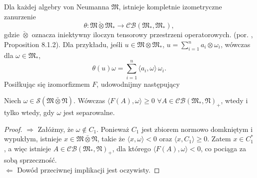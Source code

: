 Dla każdej algebry von Neumanna $\mathfrak{M}$,
istnieje kompletnie izometryczne zanurzenie
\begin{equation}
\theta: \mathfrak{M} \check{\otimes} \mathfrak{M}_{*}\rightarrow
\mathcal{CB}(\mathfrak{M}_{*}, \mathfrak{M}_{*}),
\end{equation}
gdzie $\check{\otimes}$ oznacza iniektywny iloczyn tensorowy przestrzeni operatorowych.
(por. \cite{Effros2000}, Proposition 8.1.2).
Dla przykładu, jeśli
$u \in \mathfrak{M} \otimes \mathfrak{M}_{*}$, $u = \sum_{i = 1}^{n} a_{i} \otimes \omega_{i}$,
wówczas dla $\omega \in \mathfrak{M}_{*}$,
\begin{equation}
\theta(u)\omega = \sum_{i=1}^{n} \langle a_{i} , \omega \rangle \, \omega_{i}.
\end{equation}
Posiłkując się izomorfizmem $F$,
udowodnijmy następujący
\begin{Lemma}
\label{prop:34523}
Niech $\omega\in \mathcal{S}(\mathfrak{M} \bar{\otimes} \mathfrak{N})$.
Wówczas $\langle F(A),\omega\rangle\geq 0$ $\forall A\in
\mathcal{CB}(\mathfrak{M}_*,\mathfrak{N})_+$,
wtedy i tylko wtedy, gdy $\omega$ jest separowalne.
\end{Lemma}
\begin{proof}
$\Rightarrow$ Załóżmy, że $\omega\notin C_1$.
Ponieważ $C_1$ jest zbiorem normowo domkniętym i wypukłym,
istnieje $x \in \mathfrak{M} \bar{\otimes} \mathfrak{N}$,
takie że $\langle x, \omega\rangle<0$ oraz $\langle x,C_1\rangle\geq 0$.
Zatem $x\in C_1^*$, a więc istnieje $A \in \mathcal{CB}(\mathfrak{M}_*,\mathfrak{N})_+$,
dla którego $\langle F(A),\omega\rangle<0$, co pociąga za sobą sprzeczność.\\
$\Leftarrow$ Dowód przeciwnej implikacji jest oczywisty.
\end{proof}

